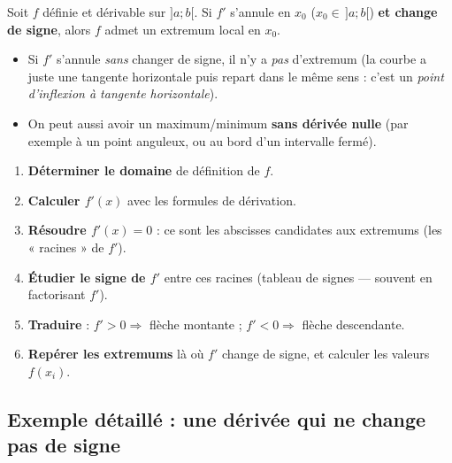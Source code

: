 \documentclass[11pt,a4paper]{article}
\begin{document}
\begin{remarque}
Soit $f$ définie et dérivable sur $]a;b[$. Si $f'$ s'annule en $x_0$ ($x_0\in\,]a;b[$)
\textbf{et change de signe}, alors $f$ admet un extremum local en $x_0$.
\begin{itemize}[leftmargin=1.6em,topsep=2pt,itemsep=1pt]
  \item Si $f'$ s'annule \emph{sans} changer de signe, il n'y a \emph{pas} d'extremum (la courbe a
        juste une tangente horizontale puis repart dans le même sens : c'est un \emph{point
        d'inflexion à tangente horizontale}).
  \item On peut aussi avoir un maximum/minimum \textbf{sans dérivée nulle} (par exemple à un point
        anguleux, ou au bord d'un intervalle fermé).
\end{itemize}
\end{remarque}

\begin{commentfaire}
\begin{enumerate}[leftmargin=1.8em,topsep=2pt,itemsep=2pt]
  \item \textbf{Déterminer le domaine} de définition de $f$.
  \item \textbf{Calculer $f'(x)$} avec les formules de dérivation.
  \item \textbf{Résoudre $f'(x)=0$} : ce sont les abscisses candidates aux extremums (les
        « racines » de $f'$).
  \item \textbf{Étudier le signe de $f'$} entre ces racines (tableau de signes — souvent en
        factorisant $f'$).
  \item \textbf{Traduire} : $f'>0\Rightarrow$ flèche montante ; $f'<0\Rightarrow$ flèche descendante.
  \item \textbf{Repérer les extremums} là où $f'$ change de signe, et calculer les valeurs $f(x_i)$.
\end{enumerate}
\end{commentfaire}

\subsection{Exemple détaillé : une dérivée qui ne change pas de signe}
\end{document}
